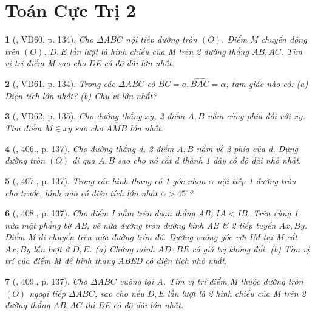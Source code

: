 \documentclass{article}
\newtheorem{baitoan}{}
\begin{document}

\section{Toán Cực Trị 2}

\begin{baitoan}[\cite{Binh_Toan_9_tap_2}, VD60, p. 134]
	Cho $\Delta ABC$ nội tiếp đường tròn $(O)$. Điểm M chuyển động trên $(O)$. $D,E$ lần lượt là hình chiếu của M trên 2 đường thẳng $AB,AC$. Tìm vị trí điểm M sao cho DE có độ dài lớn nhất.
\end{baitoan}

\begin{baitoan}[\cite{Binh_Toan_9_tap_2}, VD61, p. 134]
	Trong các $\Delta ABC$ có $BC = a,\widehat{BAC} = \alpha$, tam giác nào có: (a) Diện tích lớn nhất? (b) Chu vi lớn nhất?
\end{baitoan}

\begin{baitoan}[\cite{Binh_Toan_9_tap_2}, VD62, p. 135]
	Cho đường thẳng $xy$, 2 điểm $A,B$ nằm cùng phía đối với $xy$. Tìm điểm $M\in xy$ sao cho $\widehat{AMB}$ lớn nhất.
\end{baitoan}

\begin{baitoan}[\cite{Binh_Toan_9_tap_2}, 406., p. 137]
	Cho đường thẳng d, 2 điểm $A,B$ nằm về 2 phía của d. Dựng đường tròn $(O)$ đi qua $A,B$ sao cho nó cắt d thành 1 dây có độ dài nhỏ nhất.
\end{baitoan}

\begin{baitoan}[\cite{Binh_Toan_9_tap_2}, 407., p. 137]
	Trong các hình thang có 1 góc nhọn $\alpha$ nội tiếp 1 đường tròn cho trước, hình nào có diện tích lớn nhất $\alpha > 45^\circ$?
\end{baitoan}

\begin{baitoan}[\cite{Binh_Toan_9_tap_2}, 408., p. 137]
	Cho điểm I nằm trên đoạn thẳng AB, $IA < IB$. Trên cùng 1 nửa mặt phẳng bờ AB, vẽ nửa đường tròn đường kính AB \& 2 tiếp tuyến $Ax,By$. Điểm M di chuyển trên nửa đường tròn đó. Đường vuông góc với IM tại M cắt $Ax,By$ lần lượt ở $D,E$. (a) Chứng minh $AD\cdot BE$ có giá trị không đổi. (b) Tìm vị trí của điểm M để hình thang ABED có diện tích nhỏ nhất.
\end{baitoan}

\begin{baitoan}[\cite{Binh_Toan_9_tap_2}, 409., p. 137]
	Cho $\Delta ABC$ vuông tại A. Tìm vị trí điểm M thuộc đường tròn $(O)$ ngoại tiếp $\Delta ABC$, sao cho nếu $D,E$ lần lượt là 2 hình chiếu của M trên 2 đường thẳng $AB,AC$ thì DE có độ dài lớn nhất.
\end{baitoan}
\end{document}
